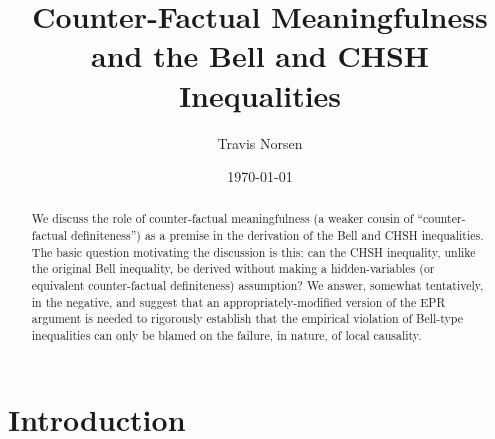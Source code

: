 \documentclass[aps,prc,twocolumn]{revtex4}
\begin{document}
\title{Counter-Factual Meaningfulness and the Bell and CHSH Inequalities}
\author{Travis Norsen}

\date{\today}

\begin{abstract}
We discuss the role of counter-factual meaningfulness (a weaker
cousin of ``counter-factual definiteness'') as a premise in
the derivation of the Bell and CHSH inequalities.  The basic question
motivating the discussion is this:  can the CHSH inequality, unlike
the original Bell inequality, be derived without making a
hidden-variables (or equivalent counter-factual definiteness)
assumption?  We answer, somewhat tentatively, in the negative, and
suggest that an appropriately-modified version of the EPR argument is
needed to rigorously establish that the empirical violation of
Bell-type inequalities can only be blamed on the failure, in nature,
of local causality.
\end{abstract}

\maketitle


\section{Introduction}
\label{intro}
\end{document}

